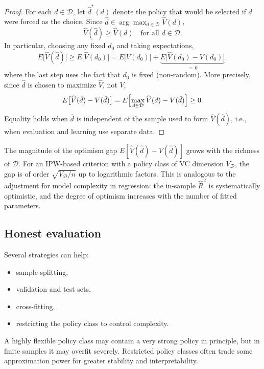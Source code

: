 \documentclass[master.tex]{subfiles}
\begin{document}
\begin{proof}
For each \(d\in\mathcal D\), let \(\hat d^\ast(d)\) denote the policy that
would be selected if \(d\) were forced as the choice. Since
\(\hat d\in\arg\max_{d\in\mathcal D}\widehat V(d)\),
\[
\widehat V(\hat d)\geq \widehat V(d) \quad \text{for all } d\in\mathcal D.
\]
In particular, choosing any fixed \(d_0\) and taking expectations,
\[
E\bigl[\widehat V(\hat d)\bigr]\geq E\bigl[\widehat V(d_0)\bigr]=E\bigl[V(d_0)\bigr]
+\underbrace{E\bigl[\widehat V(d_0)-V(d_0)\bigr]}_{=\,0},
\]
where the last step uses the fact that \(d_0\) is fixed (non-random).
More precisely, since \(\hat d\) is chosen to maximize
\(\widehat V\), not \(V\),
\[
E\bigl[\widehat V(\hat d)-V(\hat d)\bigr]
=E\Bigl[\max_{d\in\mathcal D}\widehat V(d)-V(\hat d)\Bigr]\geq 0.
\]
Equality holds when \(\hat d\) is independent of the sample used to form
\(\widehat V(\hat d)\), i.e., when evaluation and learning use separate data.
\end{proof}

\begin{remark}
The magnitude of the optimism gap \(E[\widehat V(\hat d)-V(\hat d)]\) grows
with the richness of \(\mathcal D\). For an IPW-based criterion with a policy
class of VC dimension \(V_{\mathcal D}\), the gap is of order
\(\sqrt{V_{\mathcal D}/n}\) up to logarithmic factors. This is analogous to
the adjustment for model complexity in regression: the in-sample
\(\hat R^2\) is systematically optimistic, and the degree of optimism
increases with the number of fitted parameters.
\end{remark}

\subsection{Honest evaluation}

Several strategies can help:
\begin{itemize}
    \item sample splitting,
    \item validation and test sets,
    \item cross-fitting,
    \item restricting the policy class to control complexity.
\end{itemize}

\begin{remark}
A highly flexible policy class may contain a very strong policy in principle, but in finite samples it may overfit severely. Restricted policy classes often trade some approximation power for greater stability and interpretability.
\end{remark}
\end{document}
